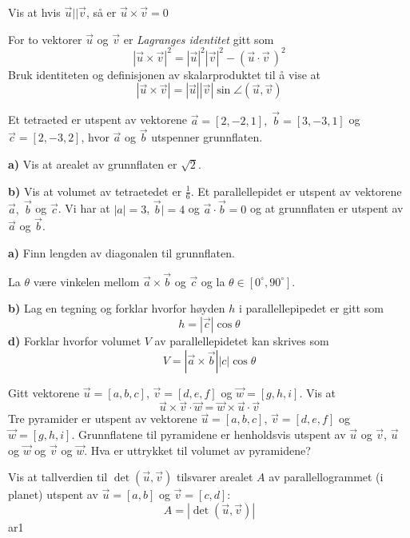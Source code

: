 Vis at hvis $ \vec{u}||\vec{v} $, så er $ \vec{u}\times\vec{v}=0 $

For to vektorer $ \vec{u} $ og $ \vec{v} $ er \textit{Lagranges identitet} gitt som
\[ |\vec{u}\times\vec{v}|^2=|\vec{u}|^2|\vec{v}|^2-(\vec{u}\cdot\vec{v}\,)^2 \]
Bruk identiteten og definisjonen av skalarproduktet til å vise at
\[ |\vec{u}\times\vec{v}|=|\vec{u}||\vec{v}|\sin \angle(\vec{u}, \vec{v})  \]\vds

Et tetraeted er utspent av vektorene $ \vec{a}=[2, -2, 1],\; \vec{b}=[3, -3, 1] $ og $ \vec{c}=[2, -3, 2] $, hvor $ \vec{a} $ og $ \vec{b} $ utspenner grunnflaten.\os

\textbf{a)} Vis at arealet av grunnflaten er $ \sqrt{2} $.\os

\textbf{b)} Vis at volumet av tetraetedet er $ \frac{1}{6} $.
\newpage
{}
Et parallellepidet er utspent av vektorene $ \vec{a},\; \vec{b} $ og $ \vec{c} $. Vi har at ${|a|=3}$,  ${\vec{b}|=4}$ og $ {\vec{a}\cdot \vec{b}=0}  $ og at grunnflaten er utspent av $ \vec{a} $ og $ \vec{b} $. \os

\textbf{a)} Finn lengden av diagonalen til grunnflaten.\os

La $ \theta $ være vinkelen mellom $ {\vec{a}\times\vec{b}} $ og $ \vec{c} $ og la $ {\theta\in[0^\circ, 90^\circ]} $.\os

\textbf{b)} Lag en tegning og forklar hvorfor høyden $ h $ i parallellepipedet er gitt som
\[ h= |\vec{c}|\cos \theta \]
\textbf{d)} Forklar hvorfor volumet $ V $ av parallellepidetet kan skrives som
\[ V= |\vec{a}\times\vec{b}||c|\cos \theta\]\vds

Gitt vektorene $ \vec{u}=[a, b, c] $, $ \vec{v}=[d, e, f] $ og $ \vec{w}=[g, h, i] $. Vis at
\[ \vec{u}\times\vec{v}\cdot\vec{w}= \vec{w}\times\vec{u}\cdot\vec{v}\]
Tre pyramider er utspent av vektorene $ \vec{u}=[a, b, c] $, $ \vec{v}=[d, e, f] $ og $ \vec{w}=[g, h, i] $. Grunnflatene til pyramidene er henholdsvis utspent av $ \vec{u} $ og $ \vec{v} $, $ \vec{u} $ og $ \vec{w} $ og $ \vec{v} $ og $ \vec{w} $. Hva er uttrykket til volumet av pyramidene?

\ekspop
Vis at tallverdien til $ \det(\vec{u}, \vec{v}) $ tilsvarer arealet $ A $ av parallellogrammet (i planet) utspent av $ \vec{u}=[a, b] $ og $ \vec{v}=[c, d] $:
\[ A = |\det(\vec{u}, \vec{v})| \]
{ar1}

